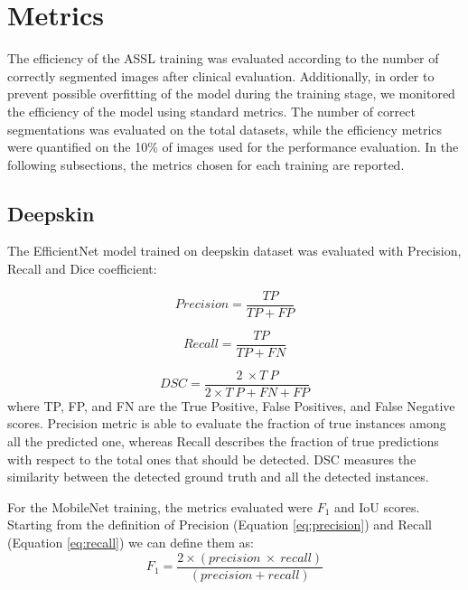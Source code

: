 \documentclass[../main.tex]{subfiles}
\begin{document}
\section{Metrics}

The efficiency of the ASSL training was evaluated according to the number of correctly segmented images after clinical evaluation.
Additionally, in order to prevent possible overfitting of the model during the training stage, we monitored the efficiency of the model using standard metrics.
The number of correct segmentations was evaluated on the total datasets, while the efficiency metrics were quantified on the 10\% of images used for the performance evaluation.
In the following subsections, the metrics chosen for each training are reported.

\subsection{Deepskin}


The EfficientNet model trained on deepskin dataset was evaluated with Precision, Recall and Dice coefficient:

\begin{equation}\label{eq:precision}
    Precision=\frac{TP}{TP+FP}
\end{equation}

\begin{equation}\label{eq:recall}
    Recall=\frac{TP}{TP+FN}
\end{equation}

\begin{equation}\label{eq:dsc}
    DSC=\frac{2\ \times T\ P}{2\times T\ P+FN+FP}
\end{equation}
where TP, FP, and FN are the True Positive, False Positives, and False Negative scores.
Precision metric is able to evaluate the fraction of true instances among all the predicted one, whereas Recall describes the fraction of true predictions with respect to the total ones that should be detected. DSC measures the similarity between the detected ground truth and all the detected instances.

For the MobileNet training, the metrics evaluated were $F_{1}$ and IoU scores.
Starting from the definition of Precision (Equation \ref{eq:precision}) and Recall (Equation \ref{eq:recall}) we can define them as:
\begin{equation}\label{eq:f1}
   F_1=\frac{2\times\left(precision\ \times\ recall\right)}{\left(precision+recall\right)}
\end{equation}
\end{document}
